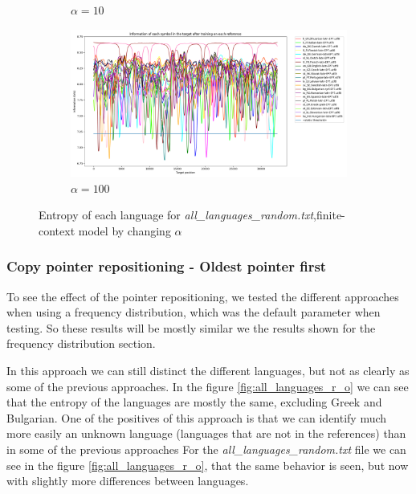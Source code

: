 \documentclass{article}
\begin{document}
\begin{figure}
\begin{subfigure}[b]{0.3\textwidth}
\begin{center}
        \end{center}
        \caption{$\alpha = 10$}
        \label{fig:all_languages_random_p_c:10:3}
    \end{subfigure}
    \hfill
    \begin{subfigure}[b]{0.3\textwidth}
        \begin{center}
            \includegraphics[width=1.0\linewidth]{../results/all_languages_random/-p_c:100:3.png}
        \end{center}
        \caption{$\alpha = 100$}
        \label{fig:all_languages_random_p_c:100:3}
    \end{subfigure}
    
    \caption{Entropy of each language for \textit{all\_languages\_random.txt},finite-context model by changing $\alpha$}
    \label{fig:all_languages_random_p_c:alpha}
\end{figure}

\subsubsection{Copy pointer repositioning - Oldest pointer first}
\label{subsubsec:results_locate_lang_oldest_pointer_first}

To see the effect of the pointer repositioning, we tested the different approaches when using a frequency distribution, which was the default parameter when testing.
So these results will be mostly similar we the results shown for the frequency distribution section.

In this approach we can still distinct the different languages, but not as clearly as some of the previous approaches.
In the figure \ref{fig:all_languages_r_o} we can see that the entropy of the languages are mostly the same, excluding Greek and Bulgarian.
One of the positives of this approach is that we can identify much more easily an unknown language (languages that are not in the references) than in some of the previous approaches
For the \textit{all\_languages\_random.txt} file we can see in the figure \ref{fig:all_languages_r_o}, that the same behavior is seen, but now with slightly more differences between languages.
\end{document}
